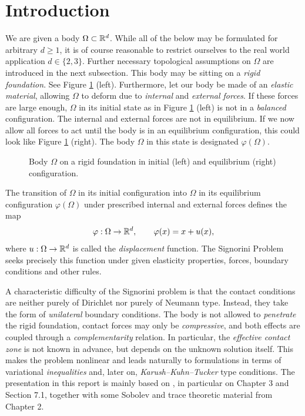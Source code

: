 \section{Introduction}\label{sec:Introduction}

We are given a body $\Omega\subset{\mathbb R}^d$. While all of the below may be formulated for arbitrary $d\ge 1$, it is of course reasonable to restrict ourselves to the real world application $d\in\{2,3\}$. Further necessary topological assumptions on $\Omega$ are introduced in the next subsection. This body may be sitting on a {\em rigid foundation}. See Figure \ref{fig:setup_plain} (left). Furthermore, let our body be made of an {\em elastic material}, allowing $\Omega$ to deform due to {\em internal} and {\em external forces}. If these forces are large enough, $\Omega$ in its initial state as in Figure \ref{fig:setup_plain} (left) is not in a {\em balanced} configuration. The internal and external forces are not in equilibrium. If we now allow all forces to act until the body is in an equilibrium configuration, this could look like Figure \ref{fig:setup_plain} (right). The body $\Omega$ in this state is designated $\varphi(\Omega)$.

\begin{figure}[!h]
	\centering
	
	\caption{Body $\Omega$ on a rigid foundation in initial (left) and equilibrium (right) configuration.}
	\label{fig:setup_plain}
\end{figure}

The transition of $\Omega$ in its initial configuration into $\Omega$ in its equilibrium configuration $\varphi(\Omega)$ under prescribed internal and external forces defines the map
\begin{equation*}
	\varphi:\Omega\to {\mathbb R}^d,\qquad \varphi(x) = x+ u(x),
\end{equation*}
where $u: \Omega\to {\mathbb R}^d$ is called the {\em displacement} function. The Signorini Problem seeks precisely this function under given elasticity properties, forces, boundary conditions and other rules.

A characteristic difficulty of the Signorini problem is that the contact conditions are neither purely of Dirichlet nor purely of Neumann type. Instead, they take the form of {\em unilateral} boundary conditions. The body is not allowed to {\em penetrate} the rigid foundation, contact forces may only be {\em compressive}, and both effects are coupled through a {\em complementarity} relation. In particular, the {\em effective contact zone} is not known in advance, but depends on the unknown solution itself. This makes the problem nonlinear and leads naturally to formulations in terms of variational {\em inequalities} and, later on, {\em Karush--Kuhn--Tucker} type conditions. The presentation in this report is mainly based on \cite{book}, in particular on Chapter 3 and Section 7.1, together with some Sobolev and trace theoretic material from Chapter 2.

